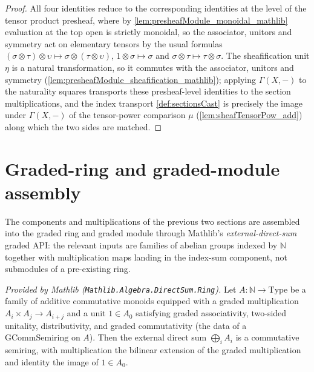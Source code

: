 \begin{proof}
  All four identities reduce to the corresponding identities at the level of the
  tensor product presheaf, where by \cref{lem:presheafModule_monoidal_mathlib}
  evaluation at the top open is strictly monoidal, so the associator, unitors and
  symmetry act on elementary tensors by the usual formulas
  \((\sigma \otimes \tau) \otimes \upsilon \mapsto
  \sigma \otimes (\tau \otimes \upsilon)\),
  \(1 \otimes \sigma \mapsto \sigma\) and
  \(\sigma \otimes \tau \mapsto \tau \otimes \sigma\). The sheafification unit
  \(\eta\) is a natural transformation, so it commutes with the associator,
  unitors and symmetry (\cref{lem:presheafModule_sheafification_mathlib}); applying
  \(\Gamma(X,-)\) to the naturality squares transports these presheaf-level
  identities to the section multiplications, and the index transport
  \cref{def:sectionsCast} is precisely the image under \(\Gamma(X,-)\) of the
  tensor-power comparison \(\mu\) (\cref{lem:sheafTensorPow_add}) along which the
  two sides are matched.
\end{proof}

\section{Graded-ring and graded-module assembly}
\label{sec:sgr_graded_assembly}

The components and multiplications of the previous two sections are assembled
into the graded ring and graded module through Mathlib's
\emph{external-direct-sum} graded API: the relevant inputs are families of
abelian groups indexed by \(\mathbb{N}\) together with multiplication maps
landing in the index-sum component, not submodules of a pre-existing ring.

\begin{lemma}
  \label{lem:directSum_gcommSemiring_mathlib}
  \mathlibok
  \textit{Provided by Mathlib (\texttt{Mathlib.Algebra.DirectSum.Ring}).}
  Let \(A : \mathbb{N} \to \mathrm{Type}\) be a family of additive commutative
  monoids equipped with a graded multiplication
  \(A_i \times A_j \to A_{i+j}\) and a unit \(1 \in A_0\) satisfying graded
  associativity, two-sided unitality, distributivity, and graded commutativity
  (the data of a \(\mathrm{GCommSemiring}\) on \(A\)). Then the external direct
  sum \(\bigoplus_i A_i\) is a commutative semiring, with multiplication the
  bilinear extension of the graded multiplication and identity the image of
  \(1 \in A_0\).
\end{lemma}

